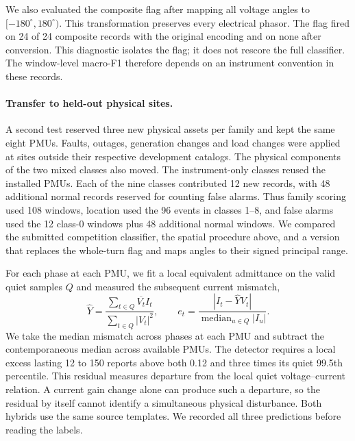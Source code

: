 We also evaluated the composite flag after mapping all voltage angles
to $[-180^\circ,180^\circ)$. This transformation preserves every
electrical phasor. The flag fired on 24 of 24 composite records with
the original encoding and on none after conversion. This diagnostic
isolates the flag; it does not rescore the full classifier. The
window-level macro-F1 therefore depends on an instrument convention
in these records.

\paragraph{Transfer to held-out physical sites.}
A second test reserved three new physical assets per family and kept the
same eight PMUs. Faults, outages, generation changes and load changes
were applied at sites outside their respective development catalogs.
The physical components of the two mixed classes also moved. The
instrument-only classes reused the installed PMUs. Each of the nine
classes contributed 12 new records, with 48 additional normal records
reserved for counting false alarms. Thus family scoring used 108 windows,
location used the 96 events in classes 1--8, and false alarms used
the 12 class-0 windows plus 48 additional normal windows. We compared the submitted competition
classifier, the spatial procedure above, and a version that replaces the
whole-turn flag and maps angles to their signed principal range.

For each phase at each PMU, we fit a local equivalent admittance on
the valid quiet samples $Q$ and measured the subsequent current mismatch,
\begin{equation}
 \widehat Y=\frac{\sum_{t\in Q}\overline{V_t} I_t}
                         {\sum_{t\in Q}|V_t|^2},\qquad
 e_t=\frac{|I_t-\widehat Y V_t|}{\operatorname{median}_{u\in Q}|I_u|}.
\end{equation}
We take the median mismatch across phases at each PMU and subtract the
contemporaneous median across available PMUs. The detector requires a
local excess lasting 12 to 150 reports above both 0.12 and three times
its quiet 99.5th percentile. This residual measures departure from the
local quiet voltage--current relation. A current gain change alone can
produce such a departure, so the residual by itself cannot identify a
simultaneous physical disturbance. Both hybrids use the same source
templates. We recorded all three predictions before reading the labels.

